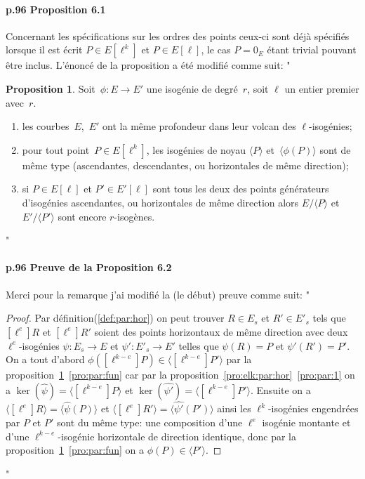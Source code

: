 \documentclass[10pt,a4paper]{article}
\theoremstyle{plain}
\theoremstyle{definition}
\theoremstyle{definition}
\theoremstyle{definition}
\theoremstyle{definition}
\newtheorem{prop}[thm]{Proposition}
\theoremstyle{definition}
\theoremstyle{remark}
\theoremstyle{remark}
\theoremstyle{definition}
\begin{document}
\paragraph{p.96 Proposition 6.1}{Concernant les spécifications sur les ordres des points ceux-ci sont déjà spécifiés lorsque il est écrit $P \in E[\ell^k]$ et $P \in E[\ell]$, le cas $P=0_E$ étant trivial pouvant être inclus.  L'énoncé de la proposition a été modifié comme suit:
"
\begin{prop}\label{pro:par:iso}
Soit~$\phi: E \rightarrow E'$ une isogénie de degré~$r$, soit $\ell$ un entier 
premier avec~$r$.
\begin{enumerate}
\item\label{pro:par:1} les courbes~$E$,~$E'$ ont la même profondeur dans leur volcan des
 $\ell$-isogénies;
\item\label{pro:par:fun} pour tout point~$P \in E[\ell^k]$,
les isogénies de noyau $\langle P \rangle$ et~$\langle \phi(P) \rangle$ sont de même type
(ascendantes, descendantes, ou horizontales de même direction);
\item\label{pro:par:asc} si $P \in E[\ell]$ et $P' \in E'[\ell]$ sont tous les 
deux des points générateurs d'isogénies ascendantes, ou horizontales de même 
direction alors $E/\langle P \rangle$ et~$E'/\langle P' \rangle$ sont encore $r$-isogènes.
\end{enumerate}
\end{prop}
"}

\paragraph{p.96 Preuve de la Proposition 6.2}{Merci pour la remarque j'ai modifié la (le début) preuve comme suit:
"
\begin{proof}
Par définition(\ref{def:par:hor}) on peut trouver
$R \in E_s$ et $R' \in E'_s$ tels que $[\ell^e]R$ et $[\ell^e]R'$ 
soient des points horizontaux de même direction avec deux $\ell^e$-isogénies 
$\psi:E_s \rightarrow E$ et $\psi':E'_s \rightarrow E'$ telles que $\psi(R)=P$ 
et $\psi'(R')=P'$. On a tout d'abord $ \phi([\ell^{k-e}]P) \in \langle 
[\ell^{k-e}]P' \rangle$  par la proposition~\ref{pro:par:iso}~\eqref{pro:par:fun} car par la 
proposition~\ref{pro:elk:par:hor}~\eqref{pro:par:1} on a $\ker(\widehat{\psi})= \langle 
[\ell^{k-e}]P \rangle$ et $\ker(\widehat{\psi'})= \langle [\ell^{k-e}]P' 
\rangle$. Ensuite on a $\langle [\ell^e]R \rangle = \langle 
\widehat{\psi}(P) \rangle $ et $\langle [\ell^e]R' \rangle = \langle 
\widehat{\psi'}(P') \rangle$ ainsi les $\ell^{k}$-isogénies engendrées par 
$P$ et $P'$ sont du même type: une composition d'une $\ell^e$ isogénie montante 
et d'une $\ell^{k-e}$-isogénie horizontale de direction identique, donc par la 
proposition~\ref{pro:par:iso}~\eqref{pro:par:fun} on a $\phi(P) \in \langle P' \rangle$.
\end{proof}
"
}
\end{document}
